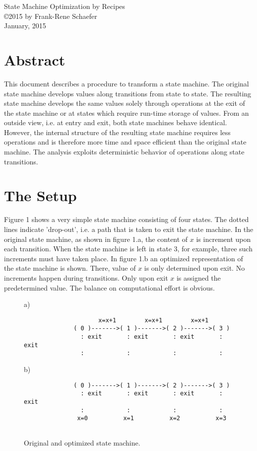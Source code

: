 \documentclass[12pt,a4paper]{scrartcl}
\begin{document}
\begin{center}
{\large State Machine Optimization by Recipes} \\ 
\copyright 2015 by Frank-Rene Schaefer         \\
January, 2015
\end{center}

%
\section{Abstract}

This document describes a procedure to transform a state machine. The original
state machine develops values along transitions from state to state. The
resulting state machine develops the same values solely through operations at
the exit of the state machine or at states which require run-time storage of
values. From an outside view, i.e. at entry and exit, both state machines
behave identical. However, the internal structure of the resulting state
machine requires less operations and is therefore more time and space efficient
than the original state machine.  The analysis exploits deterministic behavior
of operations along state transitions. 

\section{The Setup}

Figure 1 shows a very simple state machine consisting of four states.  The
dotted lines indicate 'drop-out', i.e. a path that is taken to exit the state
machine.  In the original state machine, as shown in figure 1.a, the content of
$x$ is increment upon each transition. When the state machine is left in state
3, for example, three such increments must have taken place. In figure 1.b an
optimized representation of the state machine is shown.  There, value of $x$ is
only determined upon exit.  No increments happen during transitions. Only upon
exit $x$ is assigned the predetermined value. The balance on computational
effort is obvious.

\begin{figure}[htbp] \leavevmode
a)
\begin{verbatim}
                     x=x+1        x=x+1        x=x+1
              ( 0 )------->( 1 )------->( 2 )------->( 3 )
                : exit       : exit       : exit       : exit
                :            :            :            :
\end{verbatim}
    
b)
\begin{verbatim}
              ( 0 )------->( 1 )------->( 2 )------->( 3 )
                : exit       : exit       : exit       : exit
                :            :            :            :
               x=0          x=1          x=2          x=3
    
\end{verbatim}
\caption{Original and optimized state machine.}
\end{figure}
                 
\end{document}
